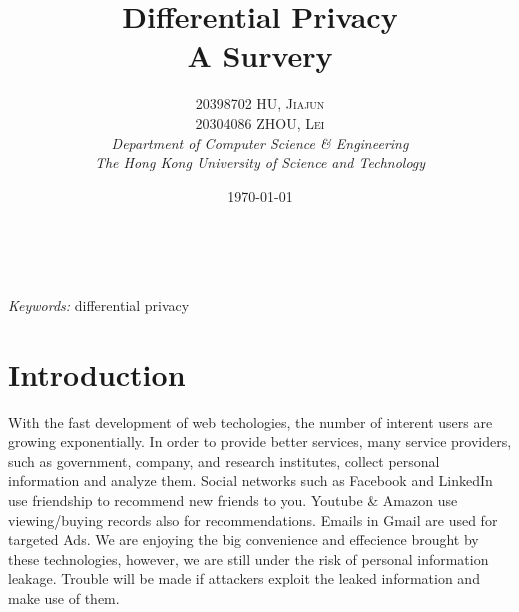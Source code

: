 \documentclass[a4paper, 11pt]{article} %
\makeatletter
\renewcommand{\maketitle}{ %
\begin{flushright} %
{\LARGE\@title} %

\vspace{50pt} %

{\large\@author} %
\\\@date %

\vspace{40pt} %
\end{flushright}
}
\makeatother
\begin{document}

\title{\textbf{Differential Privacy}\\ %
A Survery} %

\author{\textsc{20398702 HU, Jiajun \\ 20304086 ZHOU, Lei} %
\\{\textit{Department of Computer Science \& Engineering \\ The Hong Kong University of Science and Technology}}} %

\date{\today} %



\maketitle %



\begin{abstract}

\end{abstract}

\hspace*{3,6mm}\textit{Keywords:} differential privacy %

\vspace{30pt} %


\section{Introduction}
With the fast development of web techologies, the number of interent users are growing exponentially. In order to provide better services, many service providers, such as government, company, and research institutes, collect personal information and analyze them. Social networks such as Facebook and LinkedIn use friendship to recommend new friends to you. Youtube \& Amazon use viewing/buying records also for recommendations. Emails in Gmail are used for targeted Ads. We are enjoying the big convenience and effecience brought by these technologies, however, we are still under the risk of personal information leakage. Trouble will be made if attackers exploit the leaked information and make use of them.
\end{document}
